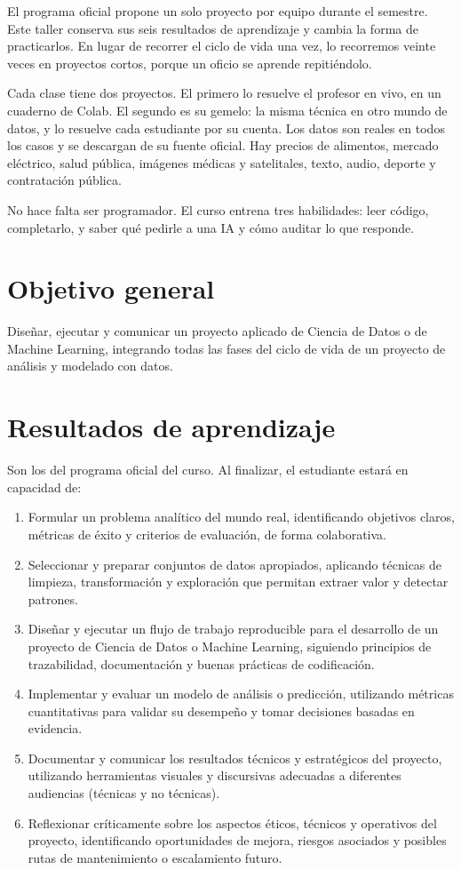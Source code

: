 \documentclass[12pt,letterpaper]{article}
\begin{document}
El programa oficial propone un solo proyecto por equipo durante el semestre. Este taller conserva sus seis resultados de aprendizaje y cambia la forma de practicarlos. En lugar de recorrer el ciclo de vida una vez, lo recorremos veinte veces en proyectos cortos, porque un oficio se aprende repitiéndolo.

Cada clase tiene dos proyectos. El primero lo resuelve el profesor en vivo, en un cuaderno de Colab. El segundo es su gemelo: la misma técnica en otro mundo de datos, y lo resuelve cada estudiante por su cuenta. Los datos son reales en todos los casos y se descargan de su fuente oficial. Hay precios de alimentos, mercado eléctrico, salud pública, imágenes médicas y satelitales, texto, audio, deporte y contratación pública.

No hace falta ser programador. El curso entrena tres habilidades: leer código, completarlo, y saber qué pedirle a una IA y cómo auditar lo que responde.

\section{Objetivo general}
Diseñar, ejecutar y comunicar un proyecto aplicado de Ciencia de Datos o de Machine Learning, integrando todas las fases del ciclo de vida de un proyecto de análisis y modelado con datos.

\section{Resultados de aprendizaje}
Son los del programa oficial del curso. Al finalizar, el estudiante estará en capacidad de:
\begin{enumerate}[label=\arabic*.]
    \item Formular un problema analítico del mundo real, identificando objetivos claros, métricas de éxito y criterios de evaluación, de forma colaborativa.
    \item Seleccionar y preparar conjuntos de datos apropiados, aplicando técnicas de limpieza, transformación y exploración que permitan extraer valor y detectar patrones.
    \item Diseñar y ejecutar un flujo de trabajo reproducible para el desarrollo de un proyecto de Ciencia de Datos o Machine Learning, siguiendo principios de trazabilidad, documentación y buenas prácticas de codificación.
    \item Implementar y evaluar un modelo de análisis o predicción, utilizando métricas cuantitativas para validar su desempeño y tomar decisiones basadas en evidencia.
    \item Documentar y comunicar los resultados técnicos y estratégicos del proyecto, utilizando herramientas visuales y discursivas adecuadas a diferentes audiencias (técnicas y no técnicas).
    \item Reflexionar críticamente sobre los aspectos éticos, técnicos y operativos del proyecto, identificando oportunidades de mejora, riesgos asociados y posibles rutas de mantenimiento o escalamiento futuro.
\end{enumerate}
\end{document}
